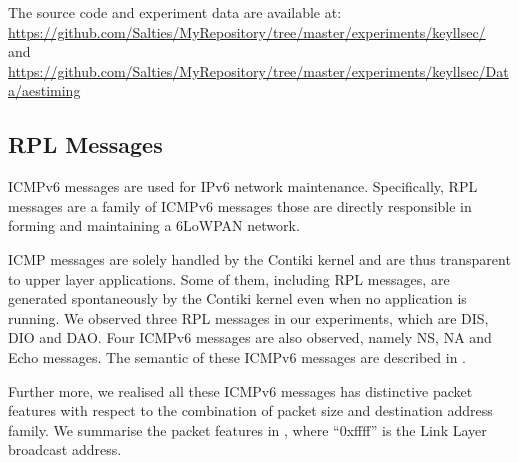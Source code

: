 The source code and experiment data are available at:\\
\url{https://github.com/Salties/MyRepository/tree/master/experiments/keyllsec/} \\
and \\
\url{https://github.com/Salties/MyRepository/tree/master/experiments/keyllsec/Data/aestiming}














\subsection{RPL Messages}

ICMPv6 messages are used for IPv6 network maintenance. Specifically, RPL messages are a family of ICMPv6 messages those are directly responsible in forming and maintaining a 6LoWPAN network. 

ICMP messages are solely handled by the Contiki kernel and are thus transparent to  upper layer applications. Some of them, including RPL messages, are generated spontaneously by the Contiki kernel even when no application is running. We observed three RPL messages in our experiments, which are DIS, DIO and DAO. Four ICMPv6 messages are also observed, namely NS, NA and Echo messages. The semantic of these ICMPv6 messages are described in .

Further more, we realised all these ICMPv6 messages has distinctive packet features with respect to the combination of packet size and destination address family. We summarise the packet features in , where ``0xffff'' is the Link Layer broadcast address.

